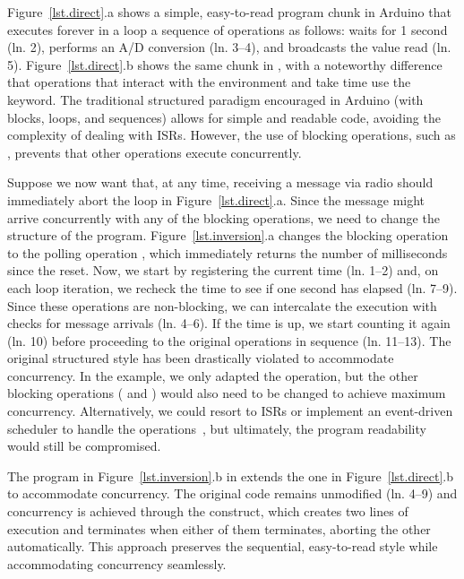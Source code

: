 Figure~\ref{lst.direct}.a shows a simple, easy-to-read program chunk in Arduino
that executes forever in a loop a sequence of operations as follows:
    waits for 1 second (ln. 2),
    performs an A/D conversion (ln. 3--4), and
    broadcasts the value read (ln. 5).
%
Figure~\ref{lst.direct}.b shows the same chunk in \CEU, with a noteworthy
difference that operations that interact with the environment and take time use
the  keyword. %
%
The traditional structured paradigm encouraged in Arduino (with blocks, loops,
and sequences) allows for simple and readable code, avoiding the complexity of
dealing with ISRs.
%
However, the use of blocking operations, such as , prevents
that other operations execute concurrently.

Suppose we now want that, at any time, receiving a message via radio should
immediately abort the loop in Figure~\ref{lst.direct}.a.
%
Since the message might arrive concurrently with any of the blocking
operations, we need to change the structure of the program.
%
Figure~\ref{lst.inversion}.a changes the blocking operation  to the
polling operation , which immediately returns the number of
milliseconds since the reset.
Now, we start by registering the current time (ln. 1--2) and, on each loop
iteration, we recheck the time to see if one second has elapsed (ln. 7--9).
Since these operations are non-blocking, we can intercalate the execution with
checks for message arrivals (ln. 4--6).
If the time is up, we start counting it again (ln. 10) before proceeding to the
original operations in sequence (ln. 11--13).
%
The original structured style has been drastically violated to accommodate
concurrency.
In the example, we only adapted the  operation, but the other
blocking operations ( and ) would also need
to be changed to achieve maximum concurrency.
%
Alternatively, we could resort to ISRs or implement an event-driven
scheduler to handle the operations~\cite{wsn.nesc}, but ultimately, the
program readability would still be compromised.

The program in Figure~\ref{lst.inversion}.b in \CEU extends the one in
Figure~\ref{lst.direct}.b to accommodate concurrency.
%
The original code remains unmodified (ln. 4--9) and concurrency is achieved
through the  construct, which creates two lines of execution and
terminates when either of them terminates, aborting the other automatically.
%
This approach preserves the sequential, easy-to-read style while accommodating
concurrency seamlessly.

